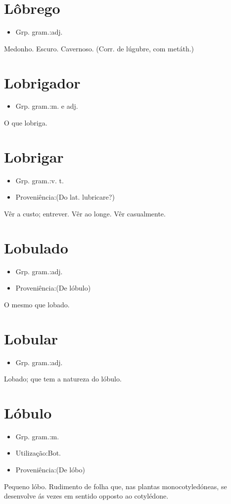 \section{Lôbrego}
\begin{itemize}
\item {Grp. gram.:adj.}
\end{itemize}
Medonho.
Escuro.
Cavernoso.
(Corr. de \textunderscore lúgubre\textunderscore , com metáth.)
\section{Lobrigador}
\begin{itemize}
\item {Grp. gram.:m.  e  adj.}
\end{itemize}
O que lobriga.
\section{Lobrigar}
\begin{itemize}
\item {Grp. gram.:v. t.}
\end{itemize}
\begin{itemize}
\item {Proveniência:(Do lat. \textunderscore lubricare\textunderscore ?)}
\end{itemize}
Vêr a custo; entrever.
Vêr ao longe.
Vêr casualmente.
\section{Lobulado}
\begin{itemize}
\item {Grp. gram.:adj.}
\end{itemize}
\begin{itemize}
\item {Proveniência:(De \textunderscore lóbulo\textunderscore )}
\end{itemize}
O mesmo que \textunderscore lobado\textunderscore .
\section{Lobular}
\begin{itemize}
\item {Grp. gram.:adj.}
\end{itemize}
Lobado; que tem a natureza do lóbulo.
\section{Lóbulo}
\begin{itemize}
\item {Grp. gram.:m.}
\end{itemize}
\begin{itemize}
\item {Utilização:Bot.}
\end{itemize}
\begin{itemize}
\item {Proveniência:(De \textunderscore lóbo\textunderscore )}
\end{itemize}
Pequeno lóbo.
Rudimento de folha que, nas plantas monocotyledóneas, se desenvolve ás vezes em sentido opposto ao cotylédone.

